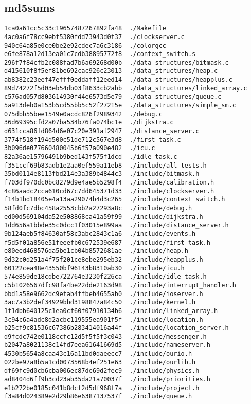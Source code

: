 \documentclass[letterpaper]{article}
\begin{document}
\subsection{md5sums}
\begin{verbatim}
1ca0a61cc5c33c19657487267892fa48  ./Makefile
4ac0a6f78cc9ebf5380fdd73943d0f37  ./clockserver.c
940c64a85e0ce0be2e92cdec7a6c3186  ./colorgcc
e6fe878a12d13ea01c7cdb38895772f8  ./context_switch.s
296f7f84cfb2c088fad7b6a69268d00b  ./data_structures/bitmask.c
d415610f8f5ef81be692cac926c23013  ./data_structures/heap.c
ab8382c23eef47efff0eddaff12eed14  ./data_structures/heapplus.c
89d74272f5d03eb54db03f8633cb2abb  ./data_structures/linked_array.c
c576ad057d803614930f44e6573d5e79  ./data_structures/queue.c
5a913deb0a153b5cd55bb5c52f27215e  ./data_structures/simple_sm.c
075dbb55bee1549e0acdc826f2989342  ./debug.c
36d69395cfd2a07ba534b76fa074bc1e  ./dijkstra.c
d631cca86fd864d6e07c20e391af2947  ./distance_server.c
3774f518f194d500c51de712c567e3d8  ./first_task.c
3b096de077660480045b6f57a090e482  ./icu.c
82a36ae15796491b9bed143f575f1dcd  ./idle_task.c
f351ccf69b83adb1e2aa0ef559a11eb8  ./include/all_tests.h
35bd0114e8113fbd214e3a389b4844c3  ./include/bitmask.h
f703df970dc0bc8279d9e4ae5b5298f4  ./include/calibration.h
4c86aadc2cca610cd67c7dd645371d33  ./include/clockserver.h
f14b1bd18405e4a13aa29074b4d3c265  ./include/context_switch.h
58fd0fc7dbc458a2553cbb2a27293a8c  ./include/debug.h
ed00d569104da52e508868ca41a59f99  ./include/dijkstra.h
1dd656a1bbde35c0dcc1f03015e899aa  ./include/distance_server.h
9b124aeb5f84630af58c3abc2843c1a6  ./include/events.h
f5d5f01a856e51feeefb0c672539e687  ./include/first_task.h
e80eed468576da5be1cb04b8572681ae  ./include/heap.h
9d32c0d251a4f75f201ce8ebe295eb32  ./include/heapplus.h
60122cea48e43550bf96143b8310ab30  ./include/icu.h
574e859de18cdbe722764e3230f226ca  ./include/idle_task.h
c5b1026567dfc98fa4be22dde2163d98  ./include/interrupt_handler.h
bbd1a58e9662dc9efab4ffbeb4655ab0  ./include/ioserver.h
3ac7a3b2def34929bbd3198847a84c50  ./include/kernel.h
1f1dbb640125c1ea0cf60f07910134b6  ./include/linked_array.h
3c94c6a4adc8d2acbc119555ea901f5f  ./include/location.h
b25cf9c81536c67386b283414016a44f  ./include/location_server.h
d9fcdc742e0118ccfc12d5f5f5f3c043  ./include/messenger.h
b2047a8021138c14fd7eea61641669d5  ./include/nameserver.h
4530b5654a8caa43c16a11bd0daeecc7  ./include/ourio.h
022be97a8b5a1cd0073568b4ef251e63  ./include/ourlib.h
df69fc9d0cb6cba006ec87de69d2fec9  ./include/physics.h
ad8404d6ff9b3cd23ab35da21a70037f  ./include/priorities.h
e1b272be0185c041b8dcf2d5df968f7a  ./include/project.h
f3a84d024389e2d29b86e6387137537f  ./include/queue.h

\end{verbatim}
\end{document}
